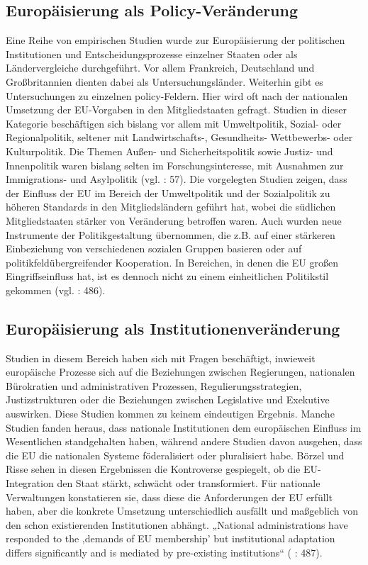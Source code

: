 \subsection{Europäisierung als Policy-Veränderung}
Eine Reihe von empirischen Studien wurde zur Europäisierung der politischen Institutionen und Entscheidungsprozesse einzelner Staaten oder als Ländervergleiche durchgeführt. Vor allem Frankreich, Deutschland und Großbritannien dienten dabei als Untersuchungsländer. Weiterhin gibt es Untersuchungen zu einzelnen policy-Feldern. Hier wird oft nach der nationalen Umsetzung der EU-Vorgaben in den Mitgliedstaaten gefragt. Studien in dieser Kategorie beschäftigen sich bislang vor allem mit Umweltpolitik, Sozial- oder Regionalpolitik, seltener mit Landwirtschafts-, Gesundheits- Wettbewerbs- oder Kulturpolitik. Die Themen Außen- und Sicherheitspolitik sowie Justiz- und Innenpolitik waren bislang selten im Forschungsinteresse, mit Ausnahmen zur Immigrations- und Asylpolitik (vgl. \cite{bulmer07} : 57). Die vorgelegten Studien zeigen, dass der Einfluss der EU im Bereich der Umweltpolitik und der Sozialpolitik zu höheren Standards in den Mitgliedsländern geführt hat, wobei die südlichen Mitgliedstaaten stärker von Veränderung betroffen waren. Auch wurden neue Instrumente der Politikgestaltung übernommen, die z.B. auf einer stärkeren Einbeziehung von verschiedenen sozialen Gruppen basieren oder auf politikfeldübergreifender Kooperation. In Bereichen, in denen die EU großen Eingriffseinfluss hat, ist es dennoch nicht zu einem einheitlichen Politikstil gekommen (vgl. \cite{boeris07} : 486).
\subsection{Europäisierung als Institutionenveränderung }
Studien in diesem Bereich haben sich mit Fragen beschäftigt, inwieweit europäische Prozesse sich auf die Beziehungen zwischen Regierungen, nationalen Bürokratien und administrativen Prozessen, Regulierungsstrategien, Justizstrukturen oder die Beziehungen zwischen Legislative und Exekutive auswirken. Diese Studien kommen zu keinem eindeutigen Ergebnis. Manche Studien fanden heraus, dass nationale Institutionen dem europäischen Einfluss im Wesentlichen standgehalten haben, während andere Studien davon ausgehen, dass die EU die nationalen Systeme föderalisiert oder pluralisiert habe. Börzel und Risse sehen in diesen Ergebnissen die Kontroverse gespiegelt, ob die EU-Integration den Staat stärkt, schwächt oder transformiert. Für nationale Verwaltungen konstatieren sie, dass diese die Anforderungen der EU erfüllt haben, aber die konkrete Umsetzung unterschiedlich ausfällt und maßgeblich von den schon existierenden Institutionen abhängt. „National administrations have responded to the ‚demands of EU membership’ but institutional adaptation differs significantly and is mediated by pre-existing institutions“ (\cite{boeris07} : 487).
